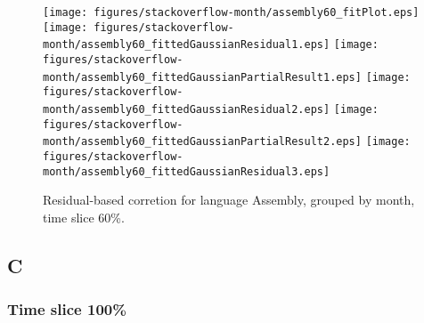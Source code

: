\begin{figure}[t]
\centering
{}
{\texttt{[image: figures/stackoverflow-month/assembly60\_fitPlot.eps]}}
{\texttt{[image: figures/stackoverflow-month/assembly60\_fittedGaussianResidual1.eps]}}
{\texttt{[image: figures/stackoverflow-month/assembly60\_fittedGaussianPartialResult1.eps]}}
{\texttt{[image: figures/stackoverflow-month/assembly60\_fittedGaussianResidual2.eps]}}
{\texttt{[image: figures/stackoverflow-month/assembly60\_fittedGaussianPartialResult2.eps]}}
{\texttt{[image: figures/stackoverflow-month/assembly60\_fittedGaussianResidual3.eps]}}
\caption{Residual-based corretion for language Assembly, grouped by month, time slice 60\%.}
\end{figure}


\FloatBarrier


\subsection{C}

\subsubsection{Time slice 100\%}

